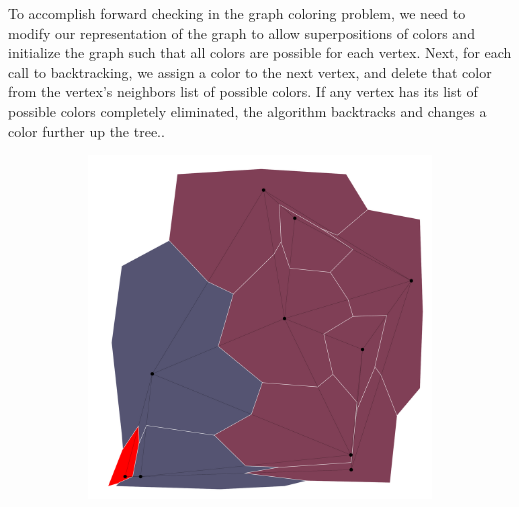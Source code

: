 \documentclass{article}
\begin{document}
		To accomplish forward checking in the graph coloring problem, we need to modify our representation of the graph to allow superpositions of colors and initialize the graph such that all colors are possible for each vertex. Next, for each call to backtracking, we assign a color to the next vertex, and delete that color from the vertex's neighbors list of possible colors. If any vertex has its list of possible colors completely eliminated, the algorithm backtracks and changes a color further up the tree.\cite{ai}.
		
		\begin{figure}[h!]
			\begin{subfigure}{0.18\textwidth}
				\centering
				\includegraphics[width=\textwidth]{images/sequences/forward_backtracking/bt_forward_I00003}
				\caption{}
			\end{subfigure}
			\;
			\begin{subfigure}{0.18\textwidth}
				\centering

\end{subfigure}
\end{figure}
\end{document}
